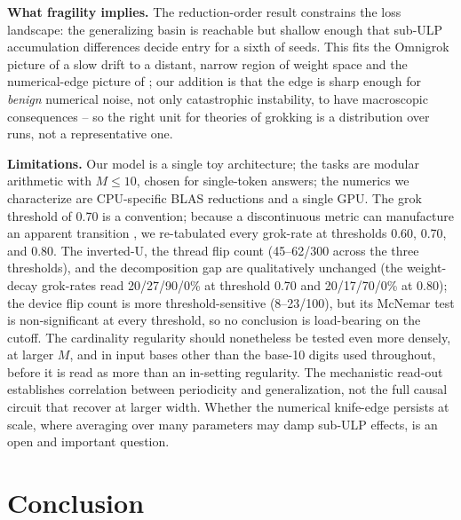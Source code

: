 \documentclass[10pt]{article} %
\begin{document}
\textbf{What fragility implies.} The reduction-order result constrains the loss landscape: the
generalizing basin is reachable but shallow enough that sub-ULP accumulation differences decide
entry for a sixth of seeds. This fits the Omnigrok picture of a slow drift to a distant, narrow
region of weight space and the numerical-edge picture of \citet{prieto2025edge}; our addition is
that the edge is sharp enough for \emph{benign} numerical noise, not only catastrophic instability,
to have macroscopic consequences -- so the right unit for theories of grokking is a distribution
over runs, not a representative one.

\textbf{Limitations.} Our model is a single toy architecture; the tasks are modular arithmetic with
$M \leq 10$, chosen for single-token answers; the numerics we characterize are CPU-specific BLAS
reductions and a single GPU. The grok threshold of 0.70 is a convention; because a discontinuous metric can manufacture an
apparent transition \citep{schaeffer2023mirage}, we re-tabulated every grok-rate at thresholds
0.60, 0.70, and 0.80. The inverted-U, the thread flip count (45--62/300 across the three thresholds), and the
decomposition gap are qualitatively unchanged (the weight-decay grok-rates read 20/27/90/0\% at
threshold 0.70 and 20/17/70/0\% at 0.80); the device flip count is more threshold-sensitive
(8--23/100), but its McNemar test is non-significant at every threshold, so no conclusion is
load-bearing on the cutoff. The cardinality regularity should
nonetheless be tested even more densely, at larger $M$, and in input bases other than the base-10
digits used throughout, before it is read as more than an in-setting regularity. The mechanistic read-out establishes correlation between periodicity and generalization, not
the full causal circuit that \citet{nanda2023progress} recover at larger width. Whether the
numerical knife-edge persists at scale, where averaging over many parameters may damp sub-ULP
effects, is an open and important question.

\section{Conclusion}
\label{sec:conclusion}
\end{document}

